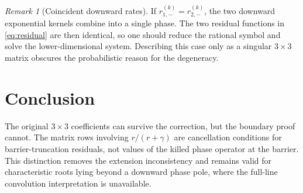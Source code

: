 \documentclass[11pt]{article}
\theoremstyle{plain}
\theoremstyle{remark}
\newtheorem{remark}{Remark}
\begin{document}
\begin{remark}[Coincident downward rates]
If $r_{1,-}^{(k)}=r_{2,-}^{(k)}$, the two downward exponential kernels combine
into a single phase.  The two residual functions in \eqref{eq:residual} are
then identical, so one should reduce the rational symbol and solve the
lower-dimensional system.  Describing this case only as a singular
$3\times3$ matrix obscures the probabilistic reason for the degeneracy.
\end{remark}

\section{Conclusion}

The original $3\times3$ coefficients can survive the correction, but the
boundary proof cannot.  The matrix rows involving
$r/(r+\gamma)$ are cancellation conditions for barrier-truncation residuals,
not values of the killed phase operator at the barrier.  This distinction
removes the extension inconsistency and remains valid for characteristic
roots lying beyond a downward phase pole, where the full-line convolution
interpretation is unavailable.
\end{document}

